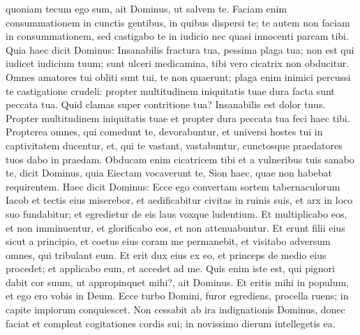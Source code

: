 \begin{biblechapter}
\begin{biblechapter}
\begin{biblechapter}
\begin{biblechapter}
\begin{biblechapter}
\begin{biblechapter}
\begin{biblechapter}
\begin{biblechapter}
\begin{biblechapter}
\begin{biblechapter}
\begin{biblechapter}
\begin{biblechapter}
\begin{biblechapter}
\begin{biblechapter}
\begin{biblechapter}
\begin{biblechapter}
\begin{biblechapter}
\begin{biblechapter}
\begin{biblechapter}
\begin{biblechapter}
\begin{biblechapter}
\begin{biblechapter}
\begin{biblechapter}
\begin{biblechapter}
\begin{biblechapter}
\begin{biblechapter}
\begin{biblechapter}
\begin{biblechapter}
\begin{biblechapter}
\begin{biblechapter}
 \verse quoniam tecum ego sum,
 ait Dominus,
 ut salvem te.
 Faciam enim consummationem in cunctis gentibus,
 in quibus dispersi te;
 te autem non faciam in consummationem,
 sed castigabo te in iudicio
 nec quasi innocenti parcam tibi.
 \verse Quia haec dicit Dominus:
 Insanabilis fractura tua,
 pessima plaga tua;
 \verse non est qui iudicet iudicium tuum;
 sunt ulceri medicamina,
 tibi vero cicatrix non obducitur.
 \verse Omnes amatores tui obliti sunt tui,
 te non quaerunt;
 plaga enim inimici percussi te
 castigatione crudeli:
 propter multitudinem iniquitatis tuae
 dura facta sunt peccata tua.
 \verse Quid clamas super contritione tua?
 Insanabilis est dolor tuus.
 Propter multitudinem iniquitatis tuae
 et propter dura peccata tua feci haec tibi.
 \verse Propterea omnes, qui comedunt te, devorabuntur,
 et universi hostes tui in captivitatem ducentur,
 et, qui te vastant, vastabuntur,
 cunctosque praedatores tuos dabo in praedam.
 \verse Obducam enim cicatricem tibi
 et a vulneribus tuis sanabo te,
 dicit Dominus,
 quia Eiectam vocaverunt te,
 Sion haec, quae non habebat requirentem.
 \verse Haec dicit Dominus:
 Ecce ego convertam sortem tabernaculorum Iacob
 et tectis eius miserebor,
 et aedificabitur civitas in ruinis suis,
 et arx in loco suo fundabitur;
 \verse et egredietur de eis laus voxque ludentium.
 Et multiplicabo eos, et non imminuentur,
 et glorificabo eos, et non attenuabuntur.
 \verse Et erunt filii eius sicut a principio,
 et coetus eius coram me permanebit,
 et visitabo adversum omnes, qui tribulant eum.
 \verse Et erit dux eius ex eo,
 et princeps de medio eius procedet; et applicabo eum, et accedet ad me.
 Quis enim iste est, qui pignori dabit cor suum,
 ut appropinquet mihi?,
 ait Dominus.
 \verse Et eritis mihi in populum,
 et ego ero vobis in Deum.
 \verse Ecce turbo Domini, furor egrediens,
 procella ruens;
 in capite impiorum conquiescet.
 \verse Non cessabit ab ira indignationis Dominus,
 donec faciat et compleat
 cogitationes cordis sui;
 in novissimo dierum intellegetis ea.
 

\end{biblechapter}
\end{biblechapter}
\end{biblechapter}
\end{biblechapter}
\end{biblechapter}
\end{biblechapter}
\end{biblechapter}
\end{biblechapter}
\end{biblechapter}
\end{biblechapter}
\end{biblechapter}
\end{biblechapter}
\end{biblechapter}
\end{biblechapter}
\end{biblechapter}
\end{biblechapter}
\end{biblechapter}
\end{biblechapter}
\end{biblechapter}
\end{biblechapter}
\end{biblechapter}
\end{biblechapter}
\end{biblechapter}
\end{biblechapter}
\end{biblechapter}
\end{biblechapter}
\end{biblechapter}
\end{biblechapter}
\end{biblechapter}
\end{biblechapter}
